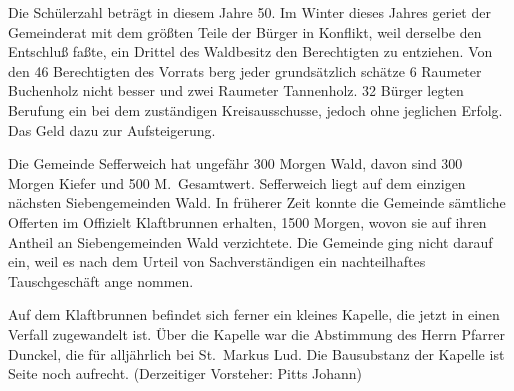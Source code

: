 

\pstart
Die Schülerzahl beträgt in diesem Jahre 50.\ob
Im Winter dieses Jahres geriet der Gemeinderat mit dem\ob
größten Teile der Bürger in Konflikt, weil derselbe den\ob
Entschluß faßte, ein Drittel des Waldbesitz den Berechtigten\ob
zu entziehen. Von den 46 Berechtigten des Vorrats berg\ob
jeder grundsätzlich schätze 6 Raumeter Buchenholz\ob
{}%
nicht besser und zwei Raumeter Tannenholz. 32\ob
Bürger legten Berufung ein bei dem zuständigen\ob
Kreisausschusse, jedoch ohne jeglichen Erfolg. Das Geld dazu zur\ob
Aufsteigerung.

Die Gemeinde Sefferweich hat ungefähr 300 Morgen Wald,\ob
davon sind 300 Morgen Kiefer und 500 M.\ Gesamtwert.\ob
Sefferweich liegt auf dem einzigen nächsten\ob
Siebengemeinden Wald. In früherer Zeit konnte die\ob
Gemeinde sämtliche Offerten im Offizielt Klaftbrunnen\ob
erhalten, 1500 Morgen, wovon sie auf ihren Antheil\ob
an Siebengemeinden Wald verzichtete. Die Gemeinde\ob
{}%
ging nicht darauf ein, weil es nach dem Urteil\ob
von Sachverständigen ein nachteilhaftes Tauschgeschäft ange\ohb
nommen.

Auf dem Klaftbrunnen befindet sich ferner ein kleines\ob
Kapelle, die jetzt in einen Verfall zugewandelt ist. Über\ob
die Kapelle war die Abstimmung des Herrn Pfarrer Dunckel, die\ob
für alljährlich bei St.\ Markus Lud. Die Bausubstanz der Kapelle ist\ob
Seite noch aufrecht. (Derzeitiger Vorsteher: Pitts Johann)
\pend
